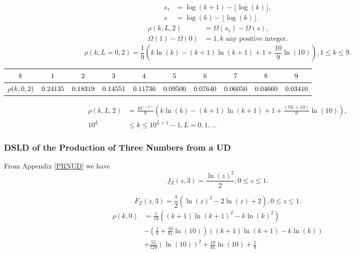 \documentclass[titlepage,fleqn]{article}%
\begin{document}
\begin{align*}
s_{1}  &  =\log(k+1)-\lfloor\log(k)\rfloor,\\
s  &  =\log(k)-\lfloor\log(k)\rfloor.
\end{align*}%
\begin{align*}
\rho(k,L,2)  &  =\Omega(s_{1})-\Omega(s),\\
\Omega(1)-\Omega(0)  &  =1,k\text{ \ any positive integer.}%
\end{align*}%
\begin{equation}
\rho(k,L=0,2)=\frac{1}{9}\left(  k\ln(k)-(k+1)\ln(k+1)+1+\frac{10}{9}%
\ln(10)\right)  ,1\leq k\leq9. \label{Prod1}%
\end{equation}%
\begin{tabular}
[c]{|c|c|c|c|c|c|c|c|c|c|}\hline\hline
${\small k}$ & ${\small 1}$ & ${\small 2}$ & ${\small 3}$ & ${\small 4}$ &
${\small 5}$ & ${\small 6}$ & ${\small 7}$ & ${\small 8}$ & ${\small 9}%
$\\\hline
${\small \rho(k,0,2)}$ & ${\small 0.24135}$ & ${\small 0.18319}$ &
${\small 0.14551}$ & ${\small 0.11736}$ & ${\small 0.09500}$ &
${\small 0.07640}$ & ${\small 0.06050}$ & ${\small 0.04660}$ &
${\small 0.03410}$\\\hline\hline
\end{tabular}%
\begin{align}
\rho(k,L,2)  &  =\frac{10^{\left(  -L\right)  }}{9}\left(  k\ln(k)-(k+1)\ln
(k+1)+1+\frac{\left(  9L+10\right)  }{9}\ln(10)\right)  ,\label{Prod2}\\
10^{L}  &  \leq k\leq10^{L+1}-1,L=0,1,\ldots\nonumber
\end{align}


\subsubsection{DSLD of the Production of Three Numbers from a UD}%

\label{Pro3}%


From Appendix
\ref{PRNUD}
we have
\[
f_{Z}(z,3)=\frac{\ln(z)^{2}}{2},0\leq z\leq1.
\]
%

\[
F_{Z}(z,3)=\frac{z}{2}\left(  \ln(z)^{2}-2\ln(z)+2\right)  ,0\leq z\leq1.
\]%
\begin{align*}
\rho(k,0)  &  =\frac{1}{18}\left(  (k+1)\ln(k+1)^{2}-k\ln(k)^{2}\right) \\
&  -\left(  \frac{1}{9}+\frac{10}{81}\ln(10)\right)  \left(  (k+1)\ln
(k+1)-k\ln(k)\right) \\
&  +\frac{55}{729}\left(  \ln(10)\right)  ^{2}+\frac{10}{81}\ln(10)+\frac
{1}{9}%
\end{align*}
%
\end{document}
